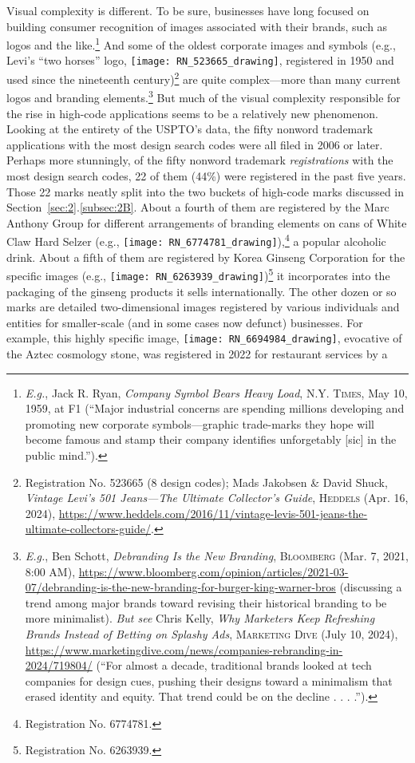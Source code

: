 \documentclass[letterpaper, 11pt, oneside]{article}
\begin{document}
Visual complexity is different. To be sure, businesses have long focused on building consumer recognition of images associated with their brands, such as logos and the like.\footnote{\textit{E.g.}, Jack R. Ryan, \textit{Company Symbol Bears Heavy Load}, \textsc{N.Y. Times}, May 10, 1959, at F1 (``Major industrial concerns are spending millions developing and promoting new corporate symbols—graphic trade-marks they hope will become famous and stamp their company identifies unforgetably [sic] in the public mind.'').} And some of the oldest corporate images and symbols (e.g., Levi's ``two horses'' logo, \texttt{[image: RN\_523665\_drawing]}, registered in 1950 and used since the nineteenth century)\footnote{Registration No. 523665 (8 design codes); Mads Jakobsen \& David Shuck, \textit{Vintage Levi's 501 Jeans—The Ultimate Collector’s Guide}, \textsc{Heddels} (Apr. 16, 2024), \url{https://www.heddels.com/2016/11/vintage-levis-501-jeans-the-ultimate-collectors-guide/}.} are quite complex—more than many current logos and branding elements.\footnote{\label{supra17} \textit{E.g.}, Ben Schott, \textit{Debranding Is the New Branding}, \textsc{Bloomberg} (Mar. 7, 2021, 8:00 AM), \url{https://www.bloomberg.com/opinion/articles/2021-03-07/debranding-is-the-new-branding-for-burger-king-warner-bros} (discussing a trend among major brands toward revising their historical branding to be more minimalist). \textit{But see} Chris Kelly, \textit{Why Marketers Keep Refreshing Brands Instead of Betting on Splashy Ads}, \textsc{Marketing Dive} (July 10, 2024), \url{https://www.marketingdive.com/news/companies-rebranding-in-2024/719804/} (``For almost a decade, traditional brands looked at tech companies for design cues, pushing their designs toward a minimalism that erased identity and equity. That trend could be on the decline . . . .'').} But much of the visual complexity responsible for the rise in high-code applications seems to be a relatively new phenomenon. Looking at the entirety of the USPTO's data, the fifty nonword trademark applications with the most design search codes were all filed in 2006 or later. Perhaps more stunningly, of the fifty nonword trademark \textit{registrations} with the most design search codes, 22 of them (44\%) were registered in the past five years. Those 22 marks neatly split into the two buckets of high-code marks discussed in Section~\ref{sec:2}.\ref{subsec:2B}. About a fourth of them are registered by the Marc Anthony Group for different arrangements of branding elements on cans of White Claw Hard Selzer (e.g., \texttt{[image: RN\_6774781\_drawing]}),\footnote{Registration No. 6774781.} a popular alcoholic drink. About a fifth of them are registered by Korea Ginseng Corporation for the specific images (e.g.,  \texttt{[image: RN\_6263939\_drawing]})\footnote{Registration No. 6263939.} it incorporates into the packaging of the ginseng products it sells internationally. The other dozen or so marks are detailed two-dimensional images registered by various individuals and entities for smaller-scale (and in some cases now defunct) businesses. For example, this highly specific image, \texttt{[image: RN\_6694984\_drawing]}, evocative of the Aztec cosmology stone, was registered in 2022 for restaurant services by a 
\end{document}
